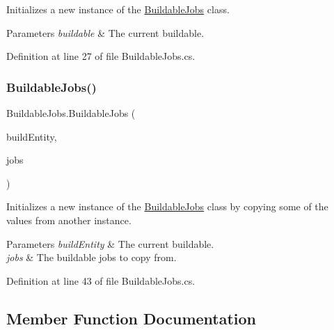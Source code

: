 Initializes a new instance of the \hyperlink{class_buildable_jobs}{Buildable\+Jobs} class. 


\begin{DoxyParams}{Parameters}
{\em buildable} & The current buildable.\\
\hline
\end{DoxyParams}


Definition at line 27 of file Buildable\+Jobs.\+cs.

\mbox{\label{class_buildable_jobs_a0039b45683227d612bb6a917cbc3b42d}} 
\subsubsection{\texorpdfstring{Buildable\+Jobs()}{BuildableJobs()}\hspace{0.1cm}{\footnotesize\ttfamily [2/2]}}
{\footnotesize\ttfamily Buildable\+Jobs.\+Buildable\+Jobs (\begin{DoxyParamCaption}\item[{\hyperlink{interface_i_buildable}{I\+Buildable}}]{build\+Entity,  }\item[{\hyperlink{class_buildable_jobs}{Buildable\+Jobs}}]{jobs }\end{DoxyParamCaption})}



Initializes a new instance of the \hyperlink{class_buildable_jobs}{Buildable\+Jobs} class by copying some of the values from another instance. 


\begin{DoxyParams}{Parameters}
{\em build\+Entity} & The current buildable.\\
\hline
{\em jobs} & The buildable jobs to copy from.\\
\hline
\end{DoxyParams}


Definition at line 43 of file Buildable\+Jobs.\+cs.



\subsection{Member Function Documentation}
\mbox{\label{class_buildable_jobs_acd535917cc45b5f3a61ca86be97ac2a8}} 
